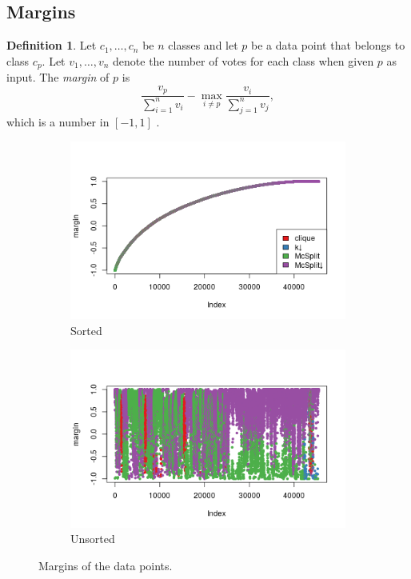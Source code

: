\documentclass{l4proj}
\theoremstyle{definition}
\newtheorem{definition}{Definition}[chapter]
\theoremstyle{remark}
\begin{document}
\subsection{Margins}

\begin{definition}
  Let $c_1, \dots, c_n$ be $n$ classes and let $p$ be a data point that belongs
  to class $c_p$. Let $v_1, \dots, v_n$ denote the number of votes for each
  class when given $p$ as input. The \emph{margin} of $p$ is
  \[ \frac{v_p}{\sum_{i=1}^n v_i} - \max_{i \ne p} \frac{v_i}{\sum_{j=1}^n v_j}, \]
  which is a number in $[-1, 1]$ \cite{forest}.
\end{definition}

\begin{figure}
  \centering
  \begin{subfigure}[t]{0.49\textwidth}
    \centering
    \includegraphics[width=\textwidth]{images/unlabelled_margin.png}
    \caption{Sorted}
    \label{fig:unlabelled_margins1}
  \end{subfigure}
  \begin{subfigure}[t]{0.49\textwidth}
    \centering
    \includegraphics[width=\textwidth]{images/unlabelled_margin2.png}
    \caption{Unsorted}
    \label{fig:unlabelled_margins2}
  \end{subfigure}
  \caption{Margins of the data points.}
  \label{fig:unlabelled_margins}
\end{figure}
\end{document}
